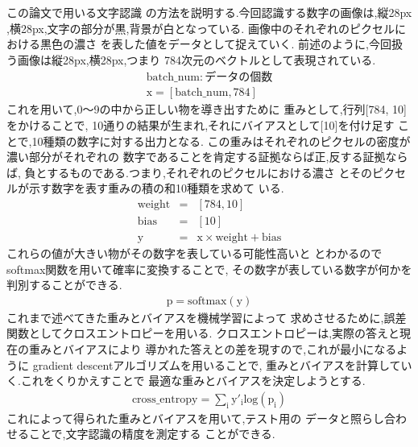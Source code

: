 \documentclass[12pt, a4paper, titlepage]{jarticle}
\begin{document}
			\subsubsection{}
			この論文で用いる文字認識
			の方法を説明する.今回認識する数字の画像は,縦28px
			,横28px,文字の部分が黒,背景が白となっている.
			画像中のそれぞれのピクセルにおける黒色の濃さ
			を表した値をデータとして捉えていく.
			前述のように,今回扱う画像は縦28px,横28px,つまり
			784次元のベクトルとして表現されている.
			\begin{eqnarray}
				\mathrm{batch\_num} : データの個数 \nonumber \\
				\mathrm{x = [batch\_num , 784]} \nonumber
			\end{eqnarray}
			これを用いて,0〜9の中から正しい物を導き出すために
			重みとして,行列[784, 10]をかけることで,
			10通りの結果が生まれ,それにバイアスとして[10]を付け足す
			ことで,10種類の数字に対する出力となる.
			この重みはそれぞれのピクセルの密度が濃い部分がそれぞれの
			数字であることを肯定する証拠ならば正,反する証拠ならば,
			負とするものである.つまり,それぞれのピクセルにおける濃さ
			とそのピクセルが示す数字を表す重みの積の和10種類を求めて
			いる.
			\begin{eqnarray}
				\mathrm{weight} & = & [784 , 10] \nonumber \\
				\mathrm{bias} & = & [10] \nonumber\\
				\mathrm{y} & = & \mathrm{x \times weight + bias} \nonumber
			\end{eqnarray}
			これらの値が大きい物がその数字を表している可能性高いと
			とわかるのでsoftmax関数を用いて確率に変換することで,
			その数字が表している数字が何かを判別することができる.
			\begin{eqnarray}
				\mathrm{p = softmax(y) }\nonumber
			\end{eqnarray}
			これまで述べてきた重みとバイアスを機械学習によって
			求めさせるために,誤差関数としてクロスエントロピーを用いる.
			クロスエントロピーは,実際の答えと現在の重みとバイアスにより
			導かれた答えとの差を現すので,これが最小になるように
			gradient descentアルゴリズムを用いることで,
			重みとバイアスを計算していく.これをくりかえすことで
			最適な重みとバイアスを決定しようとする.
			\begin{eqnarray}
				\mathrm{cross\_entropy = \sum_{i}^{} y'_ilog(p_i)} \nonumber
			\end{eqnarray}
			これによって得られた重みとバイアスを用いて,テスト用の
			データと照らし合わせることで,文字認識の精度を測定する
			ことができる.
			\subsubsection{}
\end{document}

